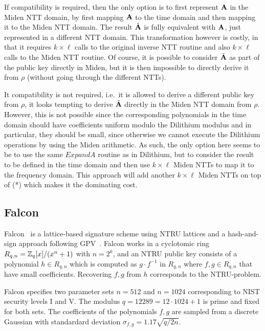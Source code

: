 If compatibility is required, then the only option is to first represent $\mathbf{A}$ in the Miden NTT domain, by first
mapping $\mathbf{A}$ to the time domain and then mapping it to the Miden NTT domain.  The result $\tilde{\mathbf{A}}$
is fully equivalent with $\mathbf{A}$, just represented in a different NTT domain.  This transformation however is
costly, in that it requires $k \times \ell$ calls to the original inverse NTT routine and also $k \times \ell$
calls to the Miden NTT routine.  Of course, it is possible to consider $\tilde{\mathbf{A}}$ as part of the public key 
directly in Miden, but it is then impossible to directly derive it from $\rho$ (without going through the
different NTTs).

It compatibility is not required, i.e.\ it is allowed to derive a different public key from $\rho$, it looks 
tempting to derive $\tilde{\mathbf{A}}$ directly in the Miden NTT domain from $\rho$.  However, this is not possible
since the corresponding polynomials in the time domain should have coefficients uniform modulo the 
Dilithium modulus and in particular, they should be small, since otherwise we cannot execute the Dilithium
operations by using the Miden arithmetic.  As such, the only option here seems to be to use the 
same $ExpandA$ routine as in Dilithium, but to consider the result to be defined in the time domain
and then use $k \times \ell$ Miden NTTs to map it to the frequency domain.  This approach 
will add another $k \times \ell$ Miden NTTs on top of (*) which  makes it the dominating cost.

\subsection{Falcon}

Falcon~\cite{falcon} is a lattice-based signature scheme using NTRU lattices and a hash-and-sign approach following GPV~\cite{GPV}.
Falcon works in a cyclotomic ring $R_{q,n} =  \mathbb{Z}_q[x]/(x^n+1)$ with $n = 2^k$, and an NTRU public key consists 
of a polynomial $h \in R_{q,n}$ which is computed as $g \cdot f^{-1}$ in $R_{q,n}$ where $f,g \in R_{q,n}$ that have small coefficients.
Recovering $f, g$ from $h$ corresponds to the NTRU-problem.  

Falcon specifies two parameter sets $n = 512$ and $n = 1024$ corresponding to NIST security levels I and V.  The modulus 
$q = 12289 = 12 \cdot 1024 + 1$ is prime and fixed for both sets.  The coefficients of the polynomials $f,g$ are sampled
from a discrete Gaussian with standardard deviation $\sigma_{f,g} = 1.17 \sqrt{q/2n}$.

